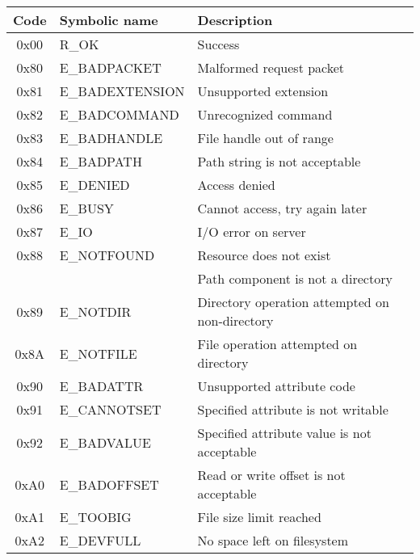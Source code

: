 \begin{table}[h]
\begin{center}

\def\tline#1#2{ {\ttfamily #1} & {\ttfamily #2} }
\begin{tabular}{|cll|}
	\hline
	Code & Symbolic name & Description \\
	\hline
	\tline{0x00}{R\_OK} & Success \\
	\hline

	\tline{0x80}{E\_BADPACKET} & Malformed request packet \\
	\tline{0x81}{E\_BADEXTENSION} & Unsupported extension \\
	\tline{0x82}{E\_BADCOMMAND} & Unrecognized command \\
	\tline{0x83}{E\_BADHANDLE} & File handle out of range \\
	\tline{0x84}{E\_BADPATH} & Path string is not acceptable \\
	\tline{0x85}{E\_DENIED} & Access denied \\
	\tline{0x86}{E\_BUSY} & Cannot access, try again later \\
	\tline{0x87}{E\_IO} & I/O error on server \\
	\tline{0x88}{E\_NOTFOUND} & Resource does not exist \\
		~ & ~ & Path component is not a directory \\
	\tline{0x89}{E\_NOTDIR} & Directory operation attempted on non-directory \\
	\tline{0x8A}{E\_NOTFILE} & File operation attempted on directory \\
	
	\hline

	\tline{0x90}{E\_BADATTR} & Unsupported attribute code \\
	\tline{0x91}{E\_CANNOTSET} & Specified attribute is not writable \\
	\tline{0x92}{E\_BADVALUE} & Specified attribute value is not acceptable \\

	\hline

	\tline{0xA0}{E\_BADOFFSET} & Read or write offset is not acceptable \\
	\tline{0xA1}{E\_TOOBIG} & File size limit reached \\
	\tline{0xA2}{E\_DEVFULL} & No space left on filesystem \\

	\hline


\end{tabular}
\end{center}
\end{table}
